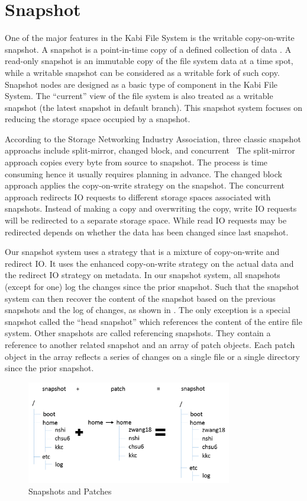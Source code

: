 \chapter{Snapshot}
\label{chap:snapshot}

    One of the major features in the Kabi File System is the writable copy-on-write snapshot. A snapshot is a point-in-time copy of a defined collection of data \cite{snapshot_def}. A read-only snapshot is an immutable copy of the file system data at a time spot, while a writable snapshot can be considered as a writable fork of such copy. Snapshot nodes are designed as a basic type of component in the Kabi File System. The ``current'' view of the file system is also treated as a writable snapshot (the latest snapshot in default branch). This snapshot system focuses on reducing the storage space occupied by a snapshot.

    According to the Storage Networking Industry Association, three classic snapshot approachs include split-mirror, changed block, and concurrent~\cite{snapshot_types} The split-mirror approach copies every byte from source to snapshot. The process is time consuming hence it usually requires planning in advance. The changed block approach applies the copy-on-write strategy on the snapshot. The concurrent approach redirects IO requests to different storage spaces associated with snapshots. Instead of making a copy and overwriting the copy, write IO requests will be redirected to a separate storage space. While read IO requests may be redirected depends on whether the data has been changed since last snapshot.

    Our snapshot system uses a strategy that is a mixture of copy-on-write and redirect IO. It uses the enhanced copy-on-write strategy on the actual data and the redirect IO strategy on metadata. In our snapshot system, all snapshots (except for one) log the changes since the prior snapshot. Such that the snapshot system can then recover the content of the snapshot based on the previous snapshots and the log of changes, as shown in . The only exception is a special snapshot called the ``head snapshot'' which references the content of the entire file system. Other snapshots are called referencing snapshots. They contain a reference to another related snapshot and an array of patch objects. Each patch object in the array reflects a series of changes on a single file or a single directory since the prior snapshot.

\begin{figure}[t]
\centering
\includegraphics[width=0.8\textwidth]{Chapter-4/figs/fig23.png}
\caption{Snapshots and Patches}
\label{fig:snapshot_patch}
\end{figure}

